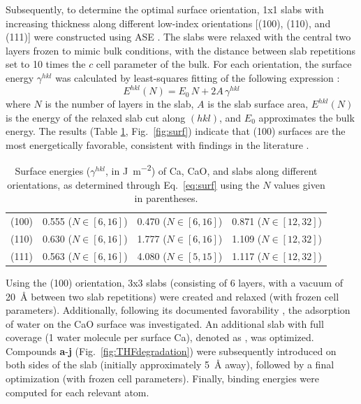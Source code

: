 \documentclass[12pt,a4paper]{article}
\begin{document}
Subsequently, to determine the optimal surface orientation, 1x1 slabs with increasing thickness along different low-index orientations [(100), (110), and (111)] were constructed using ASE \cite{larsenAtomicSimulationEnvironment2017}. The slabs were relaxed with the central two layers frozen to mimic bulk conditions, with the distance between slab repetitions set to 10 times the $c$ cell parameter of the bulk. For each orientation, the surface energy $\gamma^{hkl}$ was calculated by least-squares fitting of the following expression \cite{sunEfficientCreationConvergence2013,tranSurfaceEnergiesElemental2016}:
\begin{equation}
	E^{hkl}(N) = E_0\,N + 2A\,\gamma^{hkl} \label{eq:surf}
\end{equation}
where $N$ is the number of layers in the slab, $A$ is the slab surface area, $E^{hkl}(N)$ is the energy of the relaxed slab cut along $(hkl)$, and $E_0$ approximates the bulk energy. The results (Table \ref{tab:surf}, Fig.~\ref{fig:surf}) indicate that (100) surfaces are the most energetically favorable, consistent with findings in the literature \cite{deleeuwDensityFunctionalTheory2000,ebadiInsightsLiMetalOrganic2019}.

\begin{table}[!h]
	\centering
	\begin{tabular}{lccc}
		\toprule
		&	\ce{Ca} & \ce{CaO} &	\ce{CaH2} \\
		\midrule
		(100) & 0.555 ($N\in[6,16]$) & 0.470 ($N\in[6,16]$) & 0.871  ($N\in[12,32]$)\\
		(110) & 0.630  ($N\in[6,16]$)& 1.777  ($N\in[6,16]$)& 1.109 ($N\in[12,32]$)\\
		(111) & 0.563  ($N\in[6,16]$) & 4.080  ($N\in[5,15]$)  & 1.117   ($N\in[12,32]$) \\ 
		\bottomrule
	\end{tabular}
	\caption{Surface energies ($\gamma^{hkl}$, in \si{\joule\per\meter\squared}) of Ca, CaO, and  slabs along different orientations, as determined through Eq.~\eqref{eq:surf} using the $N$ values given in parentheses.}
	\label{tab:surf}
\end{table}

Using the (100) orientation, 3x3 slabs (consisting of 6 layers, with a vacuum of \SI{20}{\angstrom} between two slab repetitions) were created and relaxed (with frozen cell parameters). Additionally, following its documented favorability \cite{deleeuwDensityFunctionalTheory2000}, the adsorption of water on the CaO surface was investigated. An additional slab with full coverage (1 water molecule per surface Ca), denoted as , was optimized. Compounds \textbf{a}-\textbf{j} (Fig.~\ref{fig:THFdegradation}) were subsequently introduced on both sides of the slab (initially approximately \SI{5}{\angstrom} away), followed by a final optimization (with frozen cell parameters). Finally, binding energies were computed for each relevant atom.
\end{document}

